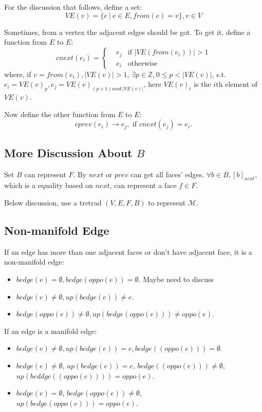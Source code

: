 \documentclass[9pt,twocolumn]{extarticle}
\begin{document}
For the discussion that follows, define a set:
\begin{equation}
VE(v)=\{e\ |\ e\in E, from(e)=v\}, v\in V
\end{equation}

Sometimes, from a vertex the adjacent edges should be got. To get it, define
a function from $E$ to $E$:
\begin{equation}
cnext(e_i) =\left\{
\begin{aligned}
&e_j& \mbox{if } |VE(from(e_i))|>1\\
&e_i& \mbox{otherwise}
\end{aligned}\right.
\end{equation}
where, if $v=from(e_i),|VE(v)|>1$, $\exists p\in \mathbb{Z}, 0\leq p<|VE(v)|$, 
s.t. $e_i=VE(v)_p,e_j=VE(v)_{(p+1)mod\ |VE(v)|}$, here $VE(v)_i$ is the $i$th element
of $VE(v)$.

Now define the other function from $E$ to $E$:
\begin{equation}
cprev(e_i)\rightarrow e_j, \mbox{ if } cnext(e_j)=e_i.
\end{equation}

\subsection{More Discussion About $B$}
Set $B$ can represent $F$. By $next$ or $prev$ can get all faces' edges.
$\forall b\in B, [b]_{next}$, which is a equality based on $next$, can represent a face $f\in F$.

Below discussion, use a tretrad $(V,E,F,B)$ to represent $\mathcal{M}$.

\subsection{Non-manifold Edge}

If an edge has more than one adjacent faces or don't have adjacent face, it
is a non-manifold edge:
\begin{itemize}
\item $bedge(e)=\emptyset,bedge(oppo(e))=\emptyset$. {\color{red} Maybe need to discuss}
\item $bedge(e)\neq\emptyset,up(bedge(e))\neq e$.
\item $bedge(oppo(e))\neq \emptyset, up(bedge(oppo(e)))\neq oppo(e)$.
\end{itemize}

If an edge is a manifold edge:
\begin{itemize}
\item $bedge(e)\neq\emptyset,up(bedge(e))= e,bedge((oppo(e)))=\emptyset$.
\item $bedge(e)\neq\emptyset$, $up(bedge(e))= e$,
$bedge((oppo(e)))\neq \emptyset$, $up(beddge((oppo(e))))= oppo(e)$.
\item $bedge(e)=\emptyset$, $bedge(oppo(e))\neq \emptyset$, $up(bedge(oppo(e)))= oppo(e)$.
\end{itemize}
\end{document}
